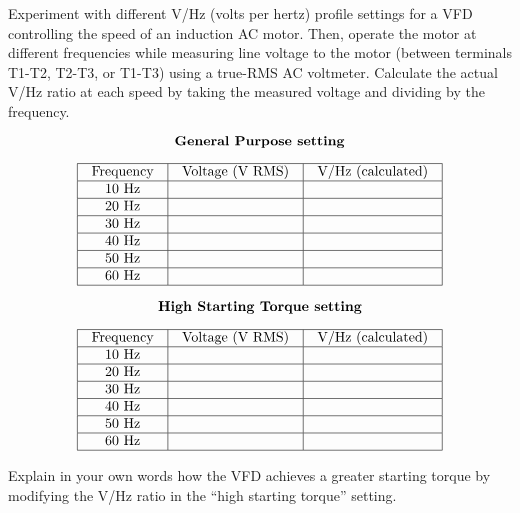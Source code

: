 
Experiment with different V/Hz (volts per hertz) profile settings for a VFD controlling the speed of an induction AC motor.  Then, operate the motor at different frequencies while measuring line voltage to the motor (between terminals T1-T2, T2-T3, or T1-T3) using a true-RMS AC voltmeter.  Calculate the actual V/Hz ratio at each speed by taking the measured voltage and dividing by the frequency.

$$\hbox{\bf General Purpose setting}$$


$$\vbox{\offinterlineskip
\halign{\strut
\vrule \quad\hfil # \ \hfil & 
\vrule \quad\hfil # \ \hfil & 
\vrule \quad\hfil # \ \hfil \vrule \cr
\noalign{\hrule}
%
Frequency & Voltage (V RMS) & V/Hz (calculated) \cr
%
\noalign{\hrule}
%
10 Hz &  & \cr
%
\noalign{\hrule}
%
20 Hz &  & \cr
%
\noalign{\hrule}
%
30 Hz &  & \cr
%
\noalign{\hrule}
%
40 Hz &  & \cr
%
\noalign{\hrule}
%
50 Hz &  & \cr
%
\noalign{\hrule}
%
60 Hz &  & \cr
%
\noalign{\hrule}
} %
}$$ %

\vskip 30pt

$$\hbox{\bf High Starting Torque setting}$$


$$\vbox{\offinterlineskip
\halign{\strut
\vrule \quad\hfil # \ \hfil & 
\vrule \quad\hfil # \ \hfil & 
\vrule \quad\hfil # \ \hfil \vrule \cr
\noalign{\hrule}
%
Frequency & Voltage (V RMS) & V/Hz (calculated) \cr
%
\noalign{\hrule}
%
10 Hz &  & \cr
%
\noalign{\hrule}
%
20 Hz &  & \cr
%
\noalign{\hrule}
%
30 Hz &  & \cr
%
\noalign{\hrule}
%
40 Hz &  & \cr
%
\noalign{\hrule}
%
50 Hz &  & \cr
%
\noalign{\hrule}
%
60 Hz &  & \cr
%
\noalign{\hrule}
} %
}$$ %

Explain in your own words how the VFD achieves a greater starting torque by modifying the V/Hz ratio in the ``high starting torque'' setting.

